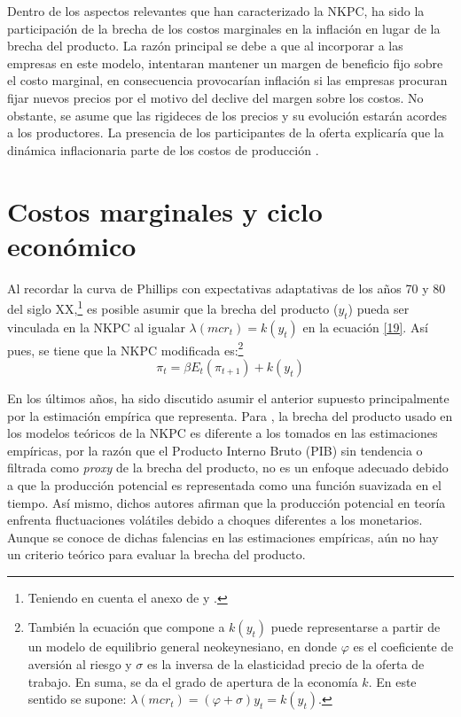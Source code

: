 Dentro de los aspectos relevantes que han caracterizado la NKPC, ha sido la participación de la brecha de los costos marginales en la inflación en lugar de la brecha del producto. La razón principal se debe a que al incorporar a las empresas en este modelo, intentaran mantener un margen de beneficio fijo sobre el costo marginal, en consecuencia provocarían inflación si las empresas procuran fijar nuevos precios por el motivo del declive del margen sobre los costos. No obstante, se asume que las rigideces de los precios y su evolución estarán acordes a los productores. La presencia de los participantes de la oferta explicaría que la dinámica inflacionaria parte de los costos de producción \citep{galvis2010estimacion}.

\section{Costos marginales y ciclo económico}\label{seccm}
Al recordar la curva de Phillips con expectativas adaptativas de los años 70 y 80 del siglo XX,\footnote{Teniendo en cuenta el anexo de  \cite{friedman1968role} y \cite{phelps1967phillips}. } es posible asumir que la brecha del producto ($y_{t}$) pueda ser vinculada en la NKPC al igualar $\lambda(mcr_{t})=k(y_{t})$ en la ecuación \eqref{19}. Así pues, se tiene que la NKPC modificada es:\footnote{También  la ecuación que compone a $k(y_{t})$ puede representarse a partir de un modelo de equilibrio general neokeynesiano, en donde $\varphi $ es el coeficiente de aversión al riesgo y $ \sigma$ es la inversa de la elasticidad precio de la oferta de trabajo. En suma, se da el grado de apertura de la economía $k$. En este sentido se supone: $\lambda(mcr_{t})=(\varphi + \sigma )y_{t}=k(y_{t})$.} 
\begin{equation}\label{20}
\pi_{t}=\beta E_{t}(\pi_{t+1})+k(y_{t})
\end{equation}

En los últimos años, ha sido discutido asumir el anterior supuesto principalmente por la estimación empírica que representa. Para \cite{gali1999inflation}, la brecha del producto usado en los modelos teóricos de la NKPC  es diferente a los tomados en las estimaciones empíricas, por la razón que el Producto Interno Bruto (PIB) sin tendencia o filtrada como \textit{proxy} de la brecha del producto, no es un enfoque adecuado debido a que la producción potencial es representada como una función suavizada en el tiempo. Así mismo, dichos autores afirman que la producción potencial en teoría enfrenta fluctuaciones volátiles debido a choques diferentes a los monetarios. Aunque se conoce de dichas falencias en las estimaciones empíricas, aún no hay un criterio teórico  para evaluar la brecha del producto.\\

